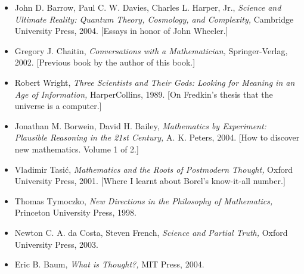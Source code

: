 \documentclass[12pt]{book}
\begin{document}
\begin{itemize}
[These two books by Maynard Smith and 
Szathm\'ary discuss evolutionary progress in terms of radical improvements 
in the representation of biological information.]
\item
John D. Barrow, Paul C. W. Davies, Charles L. Harper, Jr.,
\emph{Science and Ultimate Reality: Quantum Theory, Cosmology, and Complexity,}
Cambridge University Press, 2004.
[Essays in honor of John Wheeler.] 
\item
Gregory J. Chaitin, \emph{Conversations with a Mathematician,}
Springer-Verlag, 2002.
[Previous book by the author of this book.]
\item
Robert Wright,
\emph{Three Scientists and Their Gods: Looking for Meaning in an Age of Information,}
HarperCollins, 1989.
[On Fredkin's thesis that the universe is a computer.]
\item
Jonathan M. Borwein, David H. Bailey,
\emph{Mathematics by Experiment: Plausible Reasoning in the 21st Century,}
A. K. Peters, 2004.
[How to discover new mathematics. Volume 1 of 2.]
\item
Vladimir Tasi\'c, \emph{Mathematics and the Roots of Postmodern Thought,}
Oxford University Press, 2001.
[Where I learnt about Borel's know-it-all number.]
\item
Thomas Tymoczko, \emph{New Directions in the Philosophy of Mathematics,}
Princeton University Press, 1998.
\item
Newton C. A. da Costa, Steven French,
\emph{Science and Partial Truth,}
Oxford University Press,  2003.
\item
Eric B. Baum, \emph{What is Thought?,} MIT Press, 2004.
\end{itemize}
\end{document}
